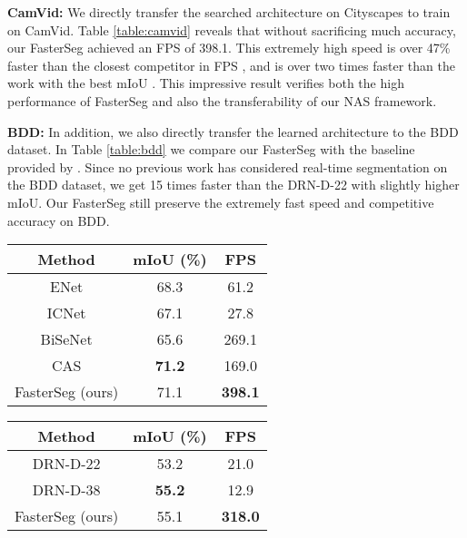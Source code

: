\documentclass{article} \usepackage{iclr2020_conference,times}
\begin{document}
\textbf{CamVid:}
We directly transfer the searched architecture on Cityscapes to train on CamVid. Table \ref{table:camvid} reveals that without sacrificing much accuracy, our FasterSeg achieved an FPS of 398.1. This extremely high speed is over 47\% faster than the closest competitor in FPS \citep{yu2018bisenet}, and is over two times faster than the work with the best mIoU \citep{zhang2019customizable}. This impressive result verifies both the high performance of FasterSeg and also the transferability of our NAS framework.




\textbf{BDD:}
In addition, we also directly transfer the learned architecture to the BDD dataset. In Table \ref{table:bdd} we compare our FasterSeg with the baseline provided by \citet{yu2018bdd100k}. Since no previous work has considered real-time segmentation on the BDD dataset, we get 15 times faster than the DRN-D-22 with slightly higher mIoU. Our FasterSeg still preserve the extremely fast speed and competitive accuracy on BDD.\vspace{-0.5em}




\begin{table*}[!htb]
\footnotesize
\begin{minipage}[t]{.48\linewidth}
\centering
\caption{mIoU and inference FPS on CamVid test set. The input resolution is .}
\begin{tabular}{ccc}
\toprule
Method & mIoU (\%) & FPS \\ \midrule
ENet \citep{paszke2016enet} & 68.3 & 61.2 \\
ICNet \citep{zhao2018icnet} & 67.1 & 27.8 \\
BiSeNet \citep{yu2018bisenet} & 65.6 & 269.1 \\
CAS \citep{zhang2019customizable} & \textbf{71.2} & 169.0 \\
FasterSeg (ours) & 71.1 & \textbf{398.1} \\ \bottomrule
\end{tabular} \label{table:camvid}
\end{minipage}\hfill \begin{minipage}[t]{.48\linewidth}
\centering
\caption{mIoU and inference FPS on BDD validation set. The input resolution is .}
\begin{tabular}{ccc}
\toprule
Method & mIoU (\%) & FPS \\ \midrule
DRN-D-22 \citep{yu2017dilated} & 53.2 & 21.0 \\
DRN-D-38 \citep{yu2017dilated} & \textbf{55.2} & 12.9 \\
FasterSeg (ours) & 55.1 & \textbf{318.0} \\ \bottomrule
\end{tabular} \label{table:bdd}
\end{minipage}\vspace{-0.5em}
\end{table*}
\end{document}
